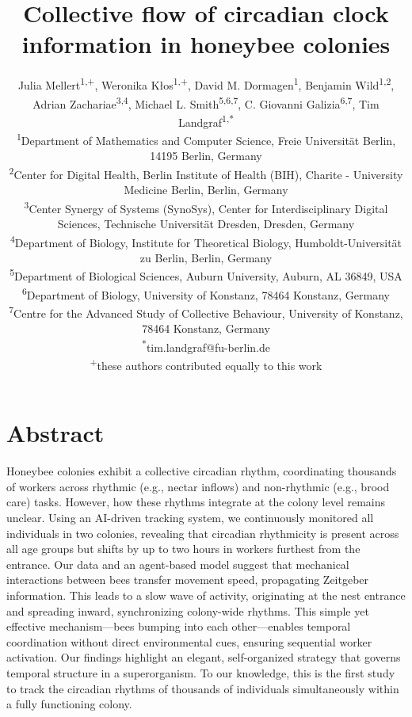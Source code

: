 \documentclass{article}
\title{Collective flow of circadian clock information in honeybee colonies}
\author{\parbox{\textwidth}{\centering
  Julia Mellert\textsuperscript{1,+}, 
  Weronika Kłos\textsuperscript{1,+}, 
  David M. Dormagen\textsuperscript{1}, 
  Benjamin Wild\textsuperscript{1,2}, 
  Adrian Zachariae\textsuperscript{3,4}, 
  Michael L. Smith\textsuperscript{5,6,7}, 
  C. Giovanni Galizia\textsuperscript{6,7}, 
  Tim Landgraf\textsuperscript{1,*}
  \\ \vspace{1em}
  \small \textsuperscript{1}Department of Mathematics and Computer Science, Freie Universität Berlin, 14195 Berlin, Germany\\
  \small \textsuperscript{2}Center for Digital Health, Berlin Institute of Health (BIH), Charite - University Medicine Berlin, Berlin, Germany\\
  \small \textsuperscript{3}Center Synergy of Systems (SynoSys), Center for Interdisciplinary Digital Sciences, Technische Universität Dresden, Dresden, Germany\\
  \small \textsuperscript{4}Department of Biology, Institute for Theoretical Biology, Humboldt-Universität zu Berlin, Berlin, Germany\\
  \small \textsuperscript{5}Department of Biological Sciences, Auburn University, Auburn, AL 36849, USA\\
  \small \textsuperscript{6}Department of Biology, University of Konstanz, 78464 Konstanz, Germany\\
  \small \textsuperscript{7}Centre for the Advanced Study of Collective Behaviour, University of Konstanz, 78464 Konstanz, Germany\\
  \small \textsuperscript{*}tim.landgraf@fu-berlin.de\\
  \small \textsuperscript{+}these authors contributed equally to this work
}}
\date{}
\newcommand{\added}[1]{{\color{blue}#1}}
\newcommand{\added}[1]{#1}
\begin{document}
\maketitle

\section{Abstract}

Honeybee colonies exhibit a collective circadian rhythm, coordinating thousands of workers across rhythmic (e.g., nectar inflows) and non-rhythmic (e.g., brood care) tasks. However, how these rhythms integrate at the colony level remains unclear. Using an AI-driven tracking system, we continuously monitored all individuals in two colonies, revealing that circadian rhythmicity is present across all age groups but shifts by up to two hours in workers furthest from the entrance. Our data and an agent-based model suggest that mechanical interactions between bees transfer movement speed, propagating Zeitgeber information. This leads to a slow wave of activity, originating at the nest entrance and spreading inward, synchronizing colony-wide rhythms. This simple yet effective mechanism—bees bumping into each other—enables temporal coordination without direct environmental cues, ensuring sequential worker activation. Our findings highlight an elegant, self-organized strategy that governs temporal structure in a superorganism. \added{To our knowledge, this is the first study to track the circadian rhythms of thousands of individuals simultaneously within a fully functioning colony.}
\end{document}
